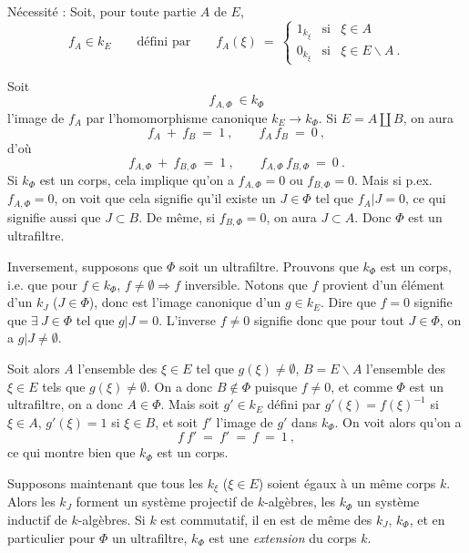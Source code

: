 \documentclass[11pt]{article}
\newcommand{\msp}[1]{\marginpar{\footnotesize [#1]}}
\begin{document}
\noindent Nécessité : Soit, pour toute partie $A$ de $E$,
\[
f_A\in k_E \qquad \text{défini par} \qquad f_A(\xi) \ = \ \left\{
\begin{array}{lll}
1_{k_\xi} & \text{si} & \xi\in A\\[1ex]
0_{k_\xi} & \text{si} & \xi\in E\backslash A \ .
\end{array}\right.
\]

\msp{page 3}
\noindent Soit
\[
f_{A,\Phi} \ \in k_\Phi
\]
l'image de $f_A$ par l'homomorphisme canonique $k_E\longrightarrow k_\Phi$. Si $E=A\amalg B$, on aura
\[
f_A \ + \ f_B \ = \ 1 \ , \qquad f_A\, f_B \ = \ 0 \ ,
\]
d'où
\[
f_{A,\Phi} \ + \ f_{B,\Phi} \ = \ 1 \ , \qquad f_{A,\Phi}\, f_{B,\Phi} \ = \ 0 \ .
\]
Si $k_\Phi$ est un corps, cela implique qu'on a $f_{A,\Phi}=0$ ou $f_{B,\Phi}=0$. Mais si p.ex. $f_{A,\Phi}=0$, on voit que cela signifie qu'il existe un $J\in\Phi$ tel que $f_A|J=0$, ce qui signifie aussi que $J\subset B$. De même, si $f_{B,\Phi}=0$, on aura $J\subset A$. Donc $\Phi$ est un ultrafiltre.

\noindent Inversement, supposons que $\Phi$ soit un ultrafiltre. Prouvons que $k_\Phi$ est un corps, i.e. que pour $f\in k_\Phi$, $f\neq\emptyset\Longrightarrow f$ inversible. Notons que $f$ provient d'un élément d'un $k_J$ ($J\in\Phi$), donc est l'image canonique d'un $g\in k_E$. Dire que $f=0$ signifie que $\exists\ J\in\Phi$ tel que $g|J=0$. L'inverse $f\neq0$ signifie donc que pour tout $J\in\Phi$, on a $g|J\neq\emptyset$.

\msp{page 4}
\noindent Soit alors $A$ l'ensemble des $\xi\in E$ tel que $g(\xi)\neq\emptyset$, $B=E\backslash A$ l'ensemble des $\xi\in E$ tels que $g(\xi)\neq\emptyset$. On a donc $B\notin\Phi$ puisque $f\neq0$, et comme $\Phi$ est un ultrafiltre, on a donc $A\in\Phi$. Mais soit $g'\in k_E$ défini par $g'(\xi)=f(\xi)^{-1}$ si $\xi\in A$, $g'(\xi)=1$ si $\xi\in B$, et soit $f'$ l'image de $g'$ dans $k_\Phi$. On voit alors qu'on a %
\[
f\ f' \ = \ f' \ = \ f \ = \ 1 \ ,
\]
ce qui montre bien que $k_\Phi$ est un corps.

\noindent Supposons maintenant que tous les $k_\xi$ ($\xi\in E$) soient égaux à un même corps $k$. Alors les $k_J$ forment un système projectif de $k$-algèbres, les $k_\Phi$ un système inductif de $k$-algèbres. Si $k$ est commutatif, il en est de même des $k_J$, $k_\Phi$, et en particulier pour $\Phi$ un ultrafiltre, $k_\Phi$ est une \textit{extension} du corps $k$.
\end{document}

